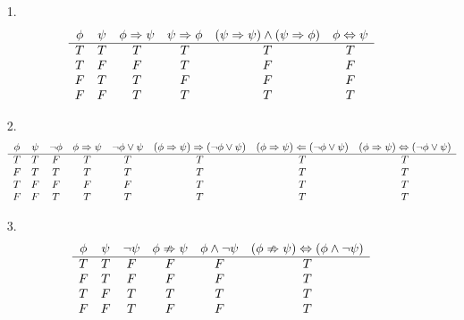 \documentclass[11pt]{exam}
\author{@dante}
\begin{document}

\begin{enumerate}[leftmargin=0pt]

\item[1.]
\begin{displaymath}
    \begin{array}{c c c c c c}
        \phi & \psi & \phi \Rightarrow \psi & \psi \Rightarrow \phi & (\psi \Rightarrow \psi) \land (\psi \Rightarrow \phi) & \phi \Leftrightarrow \psi \\
        \hline
        T & T & T & T & T & T \\
        T & F & F & T & F & F \\
        F & T & T & F & F & F \\
        F & F & T & T & T & T
    \end{array}
\end{displaymath}

\item[2.]
\begin{displaymath}
    \begin{array}{c c c c c c c c}
          \phi & \psi & \neg \phi & \phi \Rightarrow \psi & \neg \phi \lor \psi & (\phi \Rightarrow \psi) \Rightarrow (\neg \phi \lor \psi) & (\phi \Rightarrow \psi) \Leftarrow (\neg \phi \lor \psi) & (\phi \Rightarrow \psi) \Leftrightarrow (\neg \phi \lor \psi) \\
          \hline
          T & T & F & T & T & T & T & T\\
          F & T & T & T & T & T & T & T\\
          T & F & F & F & F & T & T & T\\
          F & F & T & T & T & T& T & T
    \end{array}
\end{displaymath}

\item[3.]
\begin{displaymath}
    \begin{array}{c c c c c c}
        \phi & \psi & \neg \psi & \phi \nRightarrow \psi & \phi \land \neg \psi & (\phi \nRightarrow \psi) \Leftrightarrow (\phi \land \neg \psi) \\
        \hline
        T & T & F & F & F & T \\
        F & T & F & F & F & T \\
        T & F & T & T & T & T \\
        F & F & T & F & F & T 
    \end{array}
\end{displaymath}


\end{enumerate}
\end{document}

